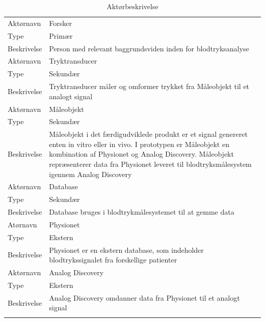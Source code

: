 \begin{longtabu} to 
	Aktørnavn & Forsker \\
     Type & Primær \\
     Beskrivelse  & Person med relevant baggrundsviden inden for blodtryksanalyse \\ 
     \midrule
     Aktørnavn & Tryktransducer \\
     Type & Sekundær \\
     Beskrivelse  & Tryktransducer måler og omformer trykket fra Måleobjekt til et analogt signal \\ 
     \midrule
     Aktørnavn & Måleobjekt  \\
     Type & Sekundær \\
     Beskrivelse  & Måleobjekt i det færdigudviklede produkt er et signal genereret enten in vitro eller in vivo. I prototypen er Måleobjekt en kombination af Physionet og Analog Discovery. Måleobjekt repræsenterer data fra Physionet leveret til blodtryksmålesystem igennem Analog Discovery \\
     \midrule
     Aktørnavn & Database \\
     Type & Sekundær \\
     Beskrivelse  & Database bruges i blodtrykmålesystemet til at gemme data \\ 
     \midrule
     Atørnavn & Physionet \\
     Type & Ekstern  \\
     Beskrivelse  & Physionet er en ekstern database, som indeholder blodtrykssignalet fra forskellige patienter \\
     \midrule
     Aktørnavn & Analog Discovery  \\
     Type & Ekstern \\
     Beskrivelse  & Analog Discovery omdanner data fra Physionet til et analogt signal \\                                                                                                                                                                          
     \bottomrule                                                                                                                   
    \caption {Aktørbeskrivelse}
\end{longtabu}


